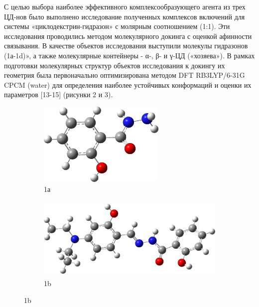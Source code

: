 \begin{multicols}{2}
С целью выбора наиболее эффективного комплексообразующего агента из трех
ЦД-нов было выполнено исследование полученных комплексов включений для
системы «циклодекстрин-гидразон» с молярным соотношением (1:1). Эти
исследования проводились методом молекулярного докинга с оценкой
афинности связывания. В качестве объектов исследования выступили
молекулы гидразонов (1а-1d)», а также молекулярные контейнеры -
α-, β- и γ-ЦД («хозяева»). В рамках подготовки молекулярных структур
объектов исследования к докингу их геометрия была первоначально
оптимизирована методом DFT RB3LYP/6-31G CPCM (water) для определения
наиболее устойчивых конформаций и оценки их параметров {[}13-15{]}
(рисунки 2 и 3).
\end{multicols}

\begin{figure}[H]
    \centering
    \begin{subfigure}[t]{0.35\textwidth}
        \centering
        \includegraphics[width=\textwidth, height=4cm]{media/chem2/image31}
        \caption*{1а}
    \end{subfigure}
    \hfill
    \begin{subfigure}[t]{0.55\textwidth}
        \centering
        \includegraphics[width=\textwidth, height=4cm]{media/chem2/image32}
        \caption*{1b}
    \end{subfigure}
    

\end{figure}

